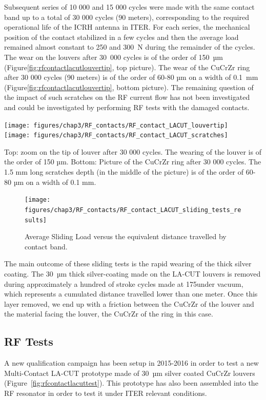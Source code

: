 {Subsequent series of 10 000 and 15 000 cycles were made with the same contact band up to a total of 30 000 cycles (90 meters), corresponding to the required operational life of the ICRH antenna in ITER. For each series, the mechanical position of the contact stabilized in a few cycles and then the average load remained almost constant to 250 and 300~N during the remainder of the cycles. The wear on the louvers after 30~000 cycles is of the order of 150~µm (Figure\ref{fig:rfcontactlacutlouvertip}, top picture). The wear of the CuCrZr ring after 30 000 cycles (90 meters) is of the order of 60-80 µm on a width of 0.1~mm (Figure\ref{fig:rfcontactlacutlouvertip}, bottom picture). The remaining question of the impact of such scratches on the RF current flow has not been investigated and could be investigated by performing RF tests with the damaged contacts.


\begin{marginfigure}
	\centering
	\texttt{[image: figures/chap3/RF\_contacts/RF\_contact\_LACUT\_louvertip]}\\
	\texttt{[image: figures/chap3/RF\_contacts/RF\_contact\_LACUT\_scratches]}
	\caption{Top: zoom on the tip of louver after 30 000 cycles. The wearing of the louver is of the order of 150 µm. Bottom: Picture of the CuCrZr ring after 30 000 cycles. The 1.5 mm long scratches depth (in the middle of the picture) is of the order of 60-80 µm on a width of 0.1 mm.}
	\label{fig:rfcontactlacutlouvertip}
\end{marginfigure}


\begin{figure}
	\centering
	\texttt{[image: figures/chap3/RF\_contacts/RF\_contact\_LACUT\_sliding\_tests\_results]}
	\caption{Average Sliding Load versus the equivalent distance travelled by contact band.}
	\label{fig:rfcontactlacutslidingtestsresults}
\end{figure}

The main outcome of these sliding tests is the rapid wearing of the thick silver coating. The 30~µm thick silver-coating made on the LA-CUT louvers is removed during approximately a hundred of stroke cycles made at 175\degC under vacuum, which represents a cumulated distance travelled lower than one meter. Once this layer removed, we end up with a friction between the CuCrZr of the louver and the material facing the louver, the CuCrZr of the ring in this case. 

\subsection{RF Tests}
A new qualification campaign has been setup in 2015-2016 in order to test a new Multi-Contact LA-CUT prototype made of 30~µm silver coated CuCrZr louvers (Figure~\ref{fig:rfcontactlacuttest}). This prototype has also been assembled into the RF resonator in order to test it under ITER relevant conditions. 

}
